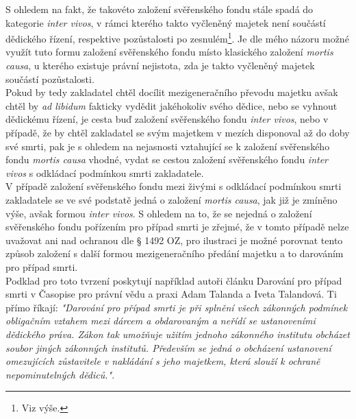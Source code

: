 \documentclass{article}
\begin{document}
S ohledem na fakt, že takovéto založení svěřenského fondu stále spadá do kategorie \textit{inter vivos}, v rámci kterého takto vyčleněný majetek není součástí dědického řízení, respektive pozůstalosti po zesnulém\footnote{Viz výše.}. Je dle mého názoru možné využít tuto formu založení svěřenského fondu místo klasického založení \textit{mortis causa}, u kterého existuje právní nejistota, zda je takto vyčleněný majetek součástí pozůstalosti.\\


Pokud by tedy zakladatel chtěl docílit mezigeneračního převodu majetku avšak chtěl by \textit{ad libidum} fakticky vydědit jakéhokoliv svého dědice, nebo se vyhnout dědickému řízení, je cesta buď založení svěřenského fondu \textit{inter vivos}, nebo v případě, že by chtěl zakladatel se svým majetkem v mezích disponoval až do doby své smrti, pak je s ohledem na nejasnosti vztahující se k založení svěřenského fondu \textit{mortis causa} vhodné, vydat se cestou založení svěřenského fondu \textit{inter vivos} s odkládací podmínkou smrti zakladatele.\\

V případě založení svěřenského fondu mezi živými s odkládací podmínkou smrti zakladatele se ve své podstatě jedná o založení \textit{mortis causa}, jak již je zmíněno výše, avšak formou \textit{inter vivos}. S ohledem na to, že se nejedná o založení svěřenského fondu pořízením pro případ smrti je zřejmé, že v tomto případě nelze uvažovat ani nad ochranou dle § 1492 OZ, pro ilustraci je možné porovnat tento způsob založení s další formou mezigeneračního předání majetku a to darováním pro případ smrti.\\

Podklad pro toto tvrzení poskytují například autoři článku Darování pro případ smrti v Časopise pro právní vědu a praxi Adam Talanda a Iveta Talandová. Ti přímo říkají: \textit{"Darování pro případ smrti je při splnění všech zákonných podmínek obligačním vztahem mezi dárcem a obdarovaným a neřídí se ustanoveními dědického práva. Zákon tak umožňuje užitím jednoho zákonného institutu obcházet soubor jiných zákonných institutů. Především se jedná o obcházení ustanovení omezujících zůstavitele v nakládání s jeho majetkem, která slouží k ochraně nepominutelných dědiců."}.\\
\end{document}
